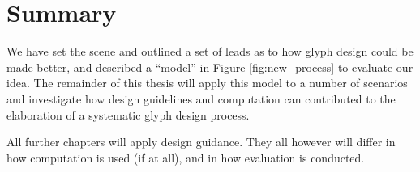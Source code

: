 %
%

\section{Summary}
We have set the scene and outlined a set of leads as to how glyph design could be made better, and described a ``model'' in Figure \ref{fig:new_process} to evaluate our idea.
The remainder of this thesis will apply this model to a number of scenarios and investigate how design guidelines and computation can contributed to the elaboration of a systematic glyph design process.

All further chapters will apply design guidance. They all however will differ in how computation is used (if at all), and in how evaluation is conducted.

